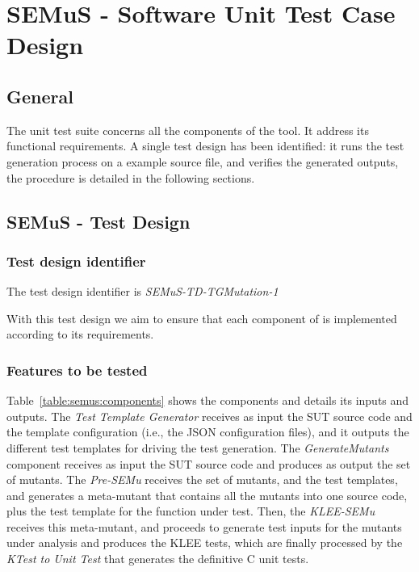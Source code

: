 
\chapter{SEMuS - Software Unit Test Case Design}
\label{chap:spec:semus}


\section{General}

The \SEMUS unit test suite concerns all the components of the tool. It address its functional requirements. A single test design has been identified: it runs the test generation process on a example source file, and verifies the generated outputs, the procedure is detailed in the following sections.



\section{SEMuS - Test Design}

\subsection{Test design identifier}

The test design identifier is \emph{SEMuS-TD-TGMutation-1}

With this test design we aim to ensure that each component of \SEMUS is implemented according to its requirements.

\subsection{Features to be tested}



Table~\ref{table:semus:components} shows the \SEMUS components and details its inputs and outputs. The \emph{Test Template Generator} receives as input the SUT source code and the template configuration (i.e., the JSON configuration files), and it outputs the different test templates for driving the test generation. The \emph{GenerateMutants} component receives as input the SUT source code and produces as output the set of mutants. The \emph{Pre-SEMu} receives the set of mutants, and the test templates, and generates a meta-mutant that contains all the mutants into one source code, plus the test template for the function under test. Then, the \emph{KLEE-SEMu} receives this meta-mutant, and proceeds to generate test inputs for the mutants under analysis and produces the KLEE tests, which are finally processed by the \emph{KTest to Unit Test} that generates the definitive C unit tests.


\clearpage

